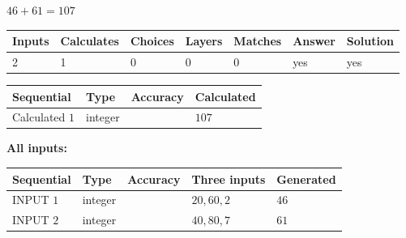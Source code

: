 \documentclass{ctexart}
\begin{document}
 

 
 
 
\noindent{}
 
 

$ %
46 +  %
61=   %
107$
 
 
\noindent{}
 
 

 
   
   
   
   
\noindent\begin{tabular}{|l|l|l|l|l|l|l|}
 \hline
Inputs & Calculates & Choices & Layers & Matches & Answer & Solution \\ \hline
 2  & 
 1  & 
 0
  & 
 0  & 
 0  & 
  yes & 
  yes 
  \\ \hline
 \end{tabular}
   
   
   
   
\noindent{}
   
   
  
  
\noindent\begin{tabular}{|l|l|l|l|}
\hline
 Sequential & Type & Accuracy & Calculated \\ 
\hline
 
 
  Calculated $  1 $ & integer &  & 
  $ 107 $ 
 \\  \hline  
 \end{tabular}
   
   
   
   
\noindent\vspace{0.1in}\hspace{-0.08in} {\textbf{\Large{All inputs: }}}
   
   
  
  
\noindent\begin{tabular}{|l|l|l|l|l|}
\hline
 Sequential & Type & Accuracy & Three inputs & Generated \\ 
\hline
 
 
  INPUT $  1 $ & integer &  & $
 20
 , 
 60
 , 
 2
 $ & $ 46 $ 
 \\  \hline  
 
 
  INPUT $  2 $ & integer &  & $
 40
 , 
 80
 , 
 7
 $ & $ 61 $ 
 \\  \hline  
 \end{tabular}
   
\end{document}
